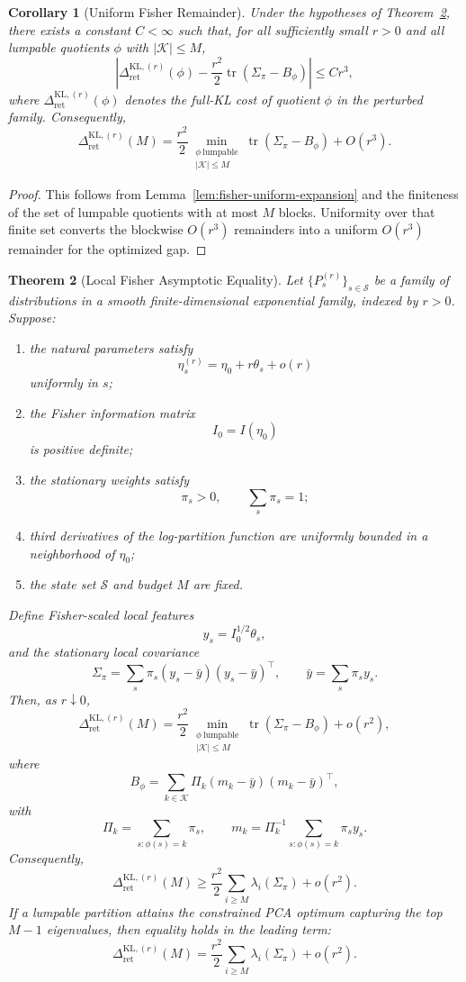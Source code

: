 \documentclass[12pt]{article}
\newtheorem{theorem}{Theorem}[section]
\newtheorem{corollary}[theorem]{Corollary}
\theoremstyle{definition}
\newcommand{\RetKLr}[1]{\Delta_{\mathrm{ret}}^{\mathrm{KL},(#1)}}
\begin{document}
\begin{corollary}[Uniform Fisher Remainder]
\label{cor:fisher-uniform-remainder}
Under the hypotheses of Theorem~\ref{thm:local-full-kl}, there exists a
constant $C<\infty$ such that, for all sufficiently small $r>0$ and all
lumpable quotients $\phi$ with $|\mathcal K|\le M$,
\[
\left|
\RetKLr{r}(\phi)
-
\frac{r^2}{2}
\operatorname{tr}(\Sigma_\pi-B_\phi)
\right|
\le
C r^3,
\]
where $\RetKLr{r}(\phi)$ denotes the full-KL cost of quotient $\phi$ in the
perturbed family.  Consequently,
\[
\RetKLr{r}(M)
=
\frac{r^2}{2}
\min_{\substack{
\phi\ \text{lumpable}\\
|\mathcal K|\le M
}}
\operatorname{tr}(\Sigma_\pi-B_\phi)
+
O(r^3).
\]
\end{corollary}

\begin{proof}
This follows from Lemma~\ref{lem:fisher-uniform-expansion} and the finiteness
of the set of lumpable quotients with at most $M$ blocks.  Uniformity over
that finite set converts the blockwise $O(r^3)$ remainders into a uniform
$O(r^3)$ remainder for the optimized gap.
\end{proof}

\begin{theorem}[Local Fisher Asymptotic Equality]
\label{thm:local-full-kl}
Let $\{P_s^{(r)}\}_{s\in\mathcal S}$ be a family of distributions in a smooth
finite-dimensional exponential family, indexed by $r>0$.  Suppose:
\begin{enumerate}[label=(\arabic*)]
\item the natural parameters satisfy
\[
\eta_s^{(r)}
=
\eta_0+r\theta_s+o(r)
\]
uniformly in $s$;
\item the Fisher information matrix
\[
I_0=I(\eta_0)
\]
is positive definite;
\item the stationary weights satisfy
\[
\pi_s>0,
\qquad
\sum_s\pi_s=1;
\]
\item third derivatives of the log-partition function are uniformly bounded in
a neighborhood of $\eta_0$;
\item the state set $\mathcal S$ and budget $M$ are fixed.
\end{enumerate}
Define Fisher-scaled local features
\[
y_s=I_0^{1/2}\theta_s,
\]
and the stationary local covariance
\[
\Sigma_\pi
=
\sum_s
\pi_s
(y_s-\bar y)(y_s-\bar y)^\top,
\qquad
\bar y=\sum_s\pi_s y_s.
\]
Then, as $r\downarrow0$,
\[
\RetKLr{r}(M)
=
\frac{r^2}{2}
\min_{\substack{
\phi\ \text{lumpable}\\
|\mathcal K|\le M
}}
\operatorname{tr}(\Sigma_\pi-B_\phi)
+
o(r^2),
\]
where
\[
B_\phi
=
\sum_{k\in\mathcal K}
\Pi_k
(m_k-\bar y)(m_k-\bar y)^\top,
\]
with
\[
\Pi_k=\sum_{s:\phi(s)=k}\pi_s,
\qquad
m_k=\Pi_k^{-1}\sum_{s:\phi(s)=k}\pi_s y_s.
\]
Consequently,
\[
\RetKLr{r}(M)
\ge
\frac{r^2}{2}
\sum_{i\ge M}
\lambda_i(\Sigma_\pi)
+
o(r^2).
\]
If a lumpable partition attains the constrained PCA optimum capturing the top
$M-1$ eigenvalues, then equality holds in the leading term:
\[
\RetKLr{r}(M)
=
\frac{r^2}{2}
\sum_{i\ge M}
\lambda_i(\Sigma_\pi)
+
o(r^2).
\]
\end{theorem}
\end{document}
